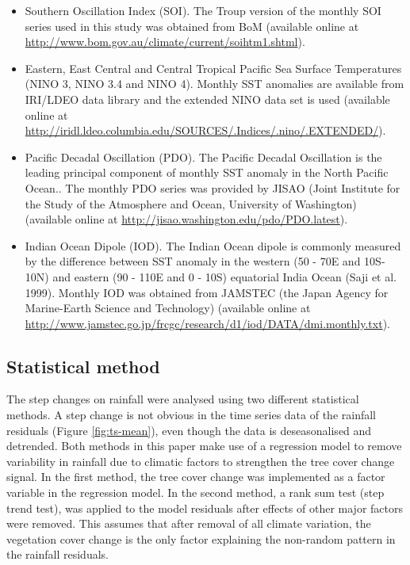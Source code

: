 \documentclass[]{elsarticle} %
\providecommand{\tightlist}{%
  \setlength{\itemsep}{0pt}\setlength{\parskip}{0pt}}
\theoremstyle{definition}
\theoremstyle{definition}
\theoremstyle{definition}
\theoremstyle{remark}
\begin{document}
\begin{itemize}
\tightlist
\item
  Southern Oscillation Index (SOI). The Troup version of the monthly SOI
  series used in this study was obtained from BoM (available online at
  \url{http://www.bom.gov.au/climate/current/soihtm1.shtml}).\\
\item
  Eastern, East Central and Central Tropical Pacific Sea Surface
  Temperatures (NINO 3, NINO 3.4 and NINO 4). Monthly SST anomalies are
  available from IRI/LDEO data library and the extended NINO data set is
  used (available online at
  \url{http://iridl.ldeo.columbia.edu/SOURCES/.Indices/.nino/.EXTENDED/}).\\
\item
  Pacific Decadal Oscillation (PDO). The Pacific Decadal Oscillation is
  the leading principal component of monthly SST anomaly in the North
  Pacific Ocean.. The monthly PDO series was provided by JISAO (Joint
  Institute for the Study of the Atmosphere and Ocean, University of
  Washington) (available online at
  \url{http://jisao.washington.edu/pdo/PDO.latest}).\\
\item
  Indian Ocean Dipole (IOD). The Indian Ocean dipole is commonly
  measured by the difference between SST anomaly in the western (50 -
  70\textdegree E and 10\textdegree S-10\textdegree N) and eastern (90 -
  110\textdegree E and 0 - 10\textdegree S) equatorial India Ocean (Saji
  et al. 1999). Monthly IOD was obtained from JAMSTEC (the Japan Agency
  for Marine-Earth Science and Technology) (available online at
  \url{http://www.jamstec.go.jp/frcgc/research/d1/iod/DATA/dmi.monthly.txt}).
\end{itemize}

\subsection{Statistical method}\label{statistical-method}

The step changes on rainfall were analysed using two different
statistical methods. A step change is not obvious in the time series
data of the rainfall residuals (Figure \ref{fig:ts-mean}), even though
the data is deseasonalised and detrended. Both methods in this paper
make use of a regression model to remove variability in rainfall due to
climatic factors to strengthen the tree cover change signal. In the
first method, the tree cover change was implemented as a factor variable
in the regression model. In the second method, a rank sum test (step
trend test), was applied to the model residuals after effects of other
major factors were removed. This assumes that after removal of all
climate variation, the vegetation cover change is the only factor
explaining the non-random pattern in the rainfall residuals.
\end{document}
